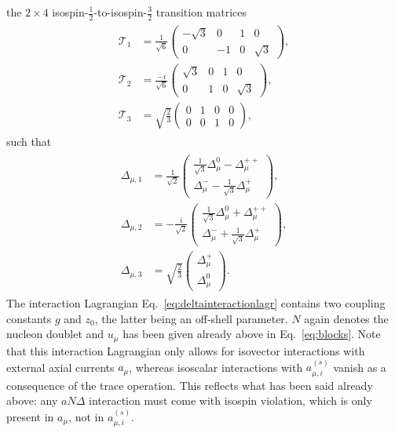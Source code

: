 \documentclass[reprint,amssymb,amsmath,floatfix,aps,prd,groupedaddress,nofootinbib]{revtex4-2}
\begin{document}
the $2\times 4$ isospin-$\tfrac{1}{2}$-to-isospin-$\tfrac{3}{2}$ transition matrices
\cite{Tang:1996sq,Pascalutsa:2006up}
\begin{align}
\begin{split}
\mathcal{T}_1 & =\frac{1}{\sqrt{6}} \begin{pmatrix} -\sqrt{3} & 0 & 1 & 0 \\ 0 & -1 & 0 & \sqrt{3} \end{pmatrix}, \\
\mathcal{T}_2 & =\frac{-i}{\sqrt{6}} \begin{pmatrix} \sqrt{3} & 0 & 1 & 0 \\ 0 & 1 & 0 & \sqrt{3} \end{pmatrix}, \\
\mathcal{T}_3 & =\sqrt{\frac{2}{3}} \begin{pmatrix} 0 & 1 & 0 & 0 \\ 0 & 0 & 1 & 0 \end{pmatrix} ,
\end{split}
\end{align}
such that
\begin{align}
\begin{split}
\Delta_{\mu,1} & = \frac{1}{\sqrt{2}} \begin{pmatrix}\frac{1}{\sqrt{3}}\Delta^0_\mu - \Delta^{++}_\mu \\ \Delta^-_\mu -\frac{1}{\sqrt{3}} \Delta^{+}_\mu  \end{pmatrix}, \\
\Delta_{\mu,2} & = -\frac{i}{\sqrt{2}} \begin{pmatrix}\frac{1}{\sqrt{3}}\Delta^0_\mu + \Delta^{++}_\mu \\ \Delta^-_\mu +\frac{1}{\sqrt{3}} \Delta^{+}_\mu  \end{pmatrix}, \\
\Delta_{\mu,3} & = \sqrt{\frac{2}{3}} \begin{pmatrix}\Delta^+_\mu \\ \Delta^0_\mu \end{pmatrix}.
\end{split}
\end{align}
The interaction Lagrangian Eq.~\eqref{eq:deltainteractionlagr} contains two coupling constants $g$ and $z_0$, 
the latter being an off-shell parameter. $N$ again denotes the nucleon doublet and $u_\mu$ has been given
already above in Eq.~\eqref{eq:blocks}. Note that this interaction Lagrangian only allows for isovector
interactions with external axial currents $a_\mu$, whereas isoscalar interactions with $a_{\mu,i}^{(s)}$
vanish as a consequence of the trace operation. This reflects what has been said already above: any
$aN\Delta$ interaction must come with isospin violation, which is only present in 
$a_\mu$, not in $a_{\mu,i}^{(s)}$.
\end{document}
